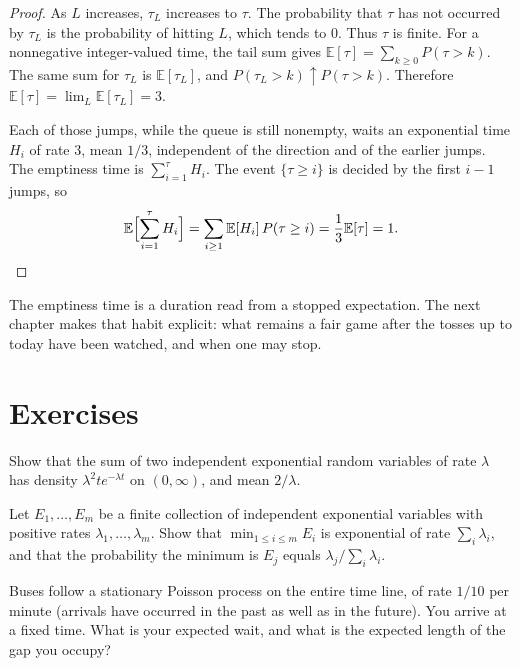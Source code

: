 \begin{proof}
As $L$ increases, $\tau_L$ increases to $\tau$. The probability that $\tau$ has not occurred by $\tau_L$ is the probability of hitting $L$, which tends to $0$. Thus $\tau$ is finite. For a nonnegative integer-valued time, the tail sum gives $\mathbb E[\tau]=\sum_{k\ge0}P(\tau>k)$. The same sum for $\tau_L$ is $\mathbb E[\tau_L]$, and $P(\tau_L>k)\uparrow P(\tau>k)$. Therefore $\mathbb E[\tau]=\lim_L\mathbb E[\tau_L]=3$.

Each of those jumps, while the queue is still nonempty, waits an exponential time $H_i$ of rate $3$, mean $1/3$, independent of the direction and of the earlier jumps. The emptiness time is $\sum_{i=1}^{\tau}H_i$. The event $\{\tau\ge i\}$ is decided by the first $i-1$ jumps, so
\[
 \mathbb E\Bigl[\sum_{i=1}^{\tau}H_i\Bigr]=\sum_{i\ge1}\mathbb E[H_i]\,P(\tau\ge i)=\frac13\mathbb E[\tau]=1.
\]
\end{proof}

The emptiness time is a duration read from a stopped expectation. The next chapter makes that habit explicit: what remains a fair game after the tosses up to today have been watched, and when one may stop.

\section{Exercises}

\begin{exercise}[$\star$]\label{ex:twoexp}
Show that the sum of two independent exponential random variables of rate $\lambda$ has density $\lambda^2 t e^{-\lambda t}$ on $(0,\infty)$, and mean $2/\lambda$.
\end{exercise}

\begin{exercise}[$\star\star$]\label{ex:minexp}
Let $E_1,\ldots,E_m$ be a finite collection of independent exponential variables with positive rates $\lambda_1,\ldots,\lambda_m$. Show that $\min_{1\le i\le m} E_i$ is exponential of rate $\sum_i\lambda_i$, and that the probability the minimum is $E_j$ equals $\lambda_j/\sum_i\lambda_i$.
\end{exercise}

\begin{exercise}[$\star\star$]\label{ex:bus}
Buses follow a stationary Poisson process on the entire time line, of rate $1/10$ per minute (arrivals have occurred in the past as well as in the future). You arrive at a fixed time. What is your expected wait, and what is the expected length of the gap you occupy?
\end{exercise}

